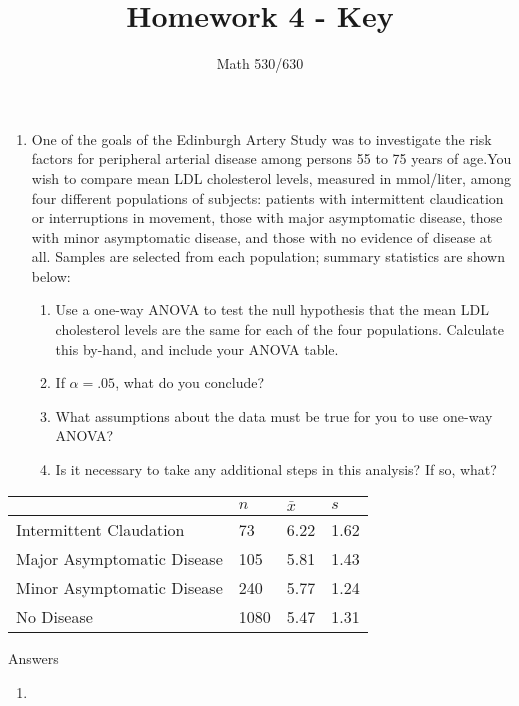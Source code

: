 \documentclass[]{article}
\title{Homework 4 - Key}
\subtitle{Math 530/630}
\author{}
\date{}
\providecommand{\tightlist}{%
  \setlength{\itemsep}{0pt}\setlength{\parskip}{0pt}}
\begin{document}
\maketitle

\begin{enumerate}
\def\labelenumi{\arabic{enumi}.}
\item
  One of the goals of the Edinburgh Artery Study was to investigate the
  risk factors for peripheral arterial disease among persons 55 to 75
  years of age.You wish to compare mean LDL cholesterol levels, measured
  in mmol/liter, among four different populations of subjects: patients
  with intermittent claudication or interruptions in movement, those
  with major asymptomatic disease, those with minor asymptomatic
  disease, and those with no evidence of disease at all. Samples are
  selected from each population; summary statistics are shown below:

  \begin{enumerate}
  \def\labelenumii{\alph{enumii}.}
  \tightlist
  \item
    Use a one-way ANOVA to test the null hypothesis that the mean LDL
    cholesterol levels are the same for each of the four populations.
    Calculate this by-hand, and include your ANOVA table.\\
  \item
    If \(\alpha=.05\), what do you conclude?
  \item
    What assumptions about the data must be true for you to use one-way
    ANOVA?
  \item
    Is it necessary to take any additional steps in this analysis? If
    so, what?
  \end{enumerate}
\end{enumerate}

\begin{longtable}[]{@{}llll@{}}
\toprule
& \(n\) & \(\bar{x}\) & \(s\)\tabularnewline
\midrule
\endhead
Intermittent Claudation & 73 & 6.22 & 1.62\tabularnewline
Major Asymptomatic Disease & 105 & 5.81 & 1.43\tabularnewline
Minor Asymptomatic Disease & 240 & 5.77 & 1.24\tabularnewline
No Disease & 1080 & 5.47 & 1.31\tabularnewline
\bottomrule
\end{longtable}

Answers

\begin{enumerate}
\def\labelenumi{\alph{enumi}.}
\item
\end{enumerate}
\end{document}
